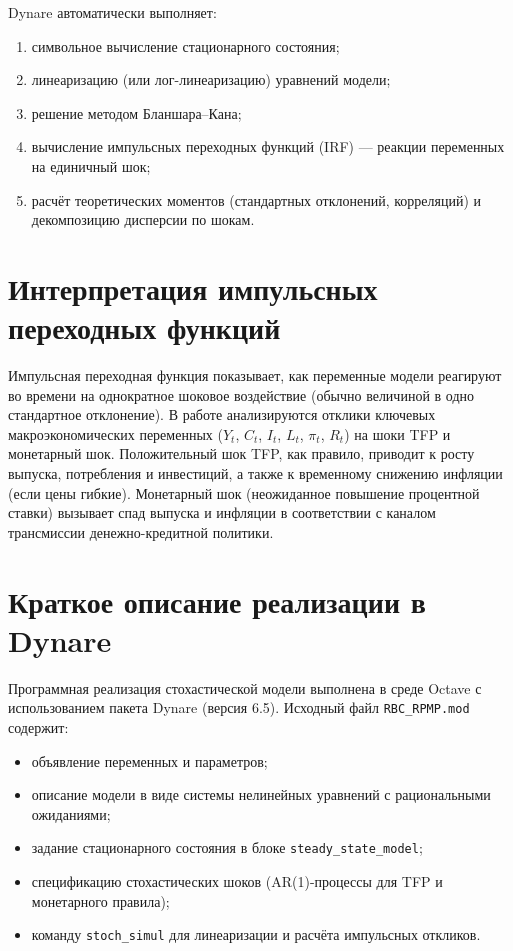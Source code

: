 \documentclass[12pt,a4paper]{report}   %
\begin{document}
        Dynare автоматически выполняет:
        \begin{enumerate}
            \item символьное вычисление стационарного состояния;
            \item линеаризацию (или лог-линеаризацию) уравнений модели;
            \item решение методом Бланшара–Кана;
            \item вычисление импульсных переходных функций (IRF) — реакции переменных на единичный шок;
            \item расчёт теоретических моментов (стандартных отклонений, корреляций) и декомпозицию дисперсии по шокам.
        \end{enumerate}

        \section{Интерпретация импульсных переходных функций}

        Импульсная переходная функция показывает, как переменные модели реагируют во времени на однократное шоковое воздействие (обычно величиной в одно стандартное отклонение). В работе анализируются отклики ключевых макроэкономических переменных ($Y_t$, $C_t$, $I_t$, $L_t$, $\pi_t$, $R_t$) на шоки TFP и монетарный шок. Положительный шок TFP, как правило, приводит к росту выпуска, потребления и инвестиций, а также к временному снижению инфляции (если цены гибкие). Монетарный шок (неожиданное повышение процентной ставки) вызывает спад выпуска и инфляции в соответствии с каналом трансмиссии денежно-кредитной политики.

        \section{Краткое описание реализации в Dynare}

        Программная реализация стохастической модели выполнена в среде Octave с использованием пакета Dynare (версия 6.5). Исходный файл \texttt{RBC\_RPMP.mod} содержит:
        \begin{itemize}
            \item объявление переменных и параметров;
            \item описание модели в виде системы нелинейных уравнений с рациональными ожиданиями;
            \item задание стационарного состояния в блоке \texttt{steady\_state\_model};
            \item спецификацию стохастических шоков (AR(1)-процессы для TFP и монетарного правила);
            \item команду \texttt{stoch\_simul} для линеаризации и расчёта импульсных откликов.
        \end{itemize}
\end{document}
